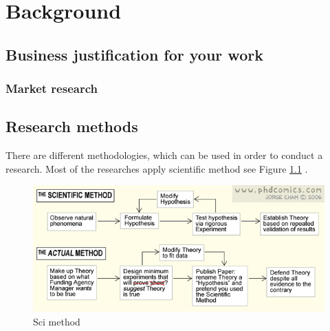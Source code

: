 \chapter{Background} %
\label{Chapter2} %

\par 

\section{Business justification for your work}

\par 

\par 

\subsection{Market research}

\par 

\par 

\section{Research methods}


\par There are different methodologies, which can be used in order to conduct a research. Most of the researches apply scientific method see Figure \ref{fig:sci-method.png} .


\begin{figure}[H]
    \centering
    \includegraphics[scale=0.9]{Figures/sci-method.png}
    \caption[Sci method]{Sci method}
    \label{fig:sci-method.png}
\end{figure}

